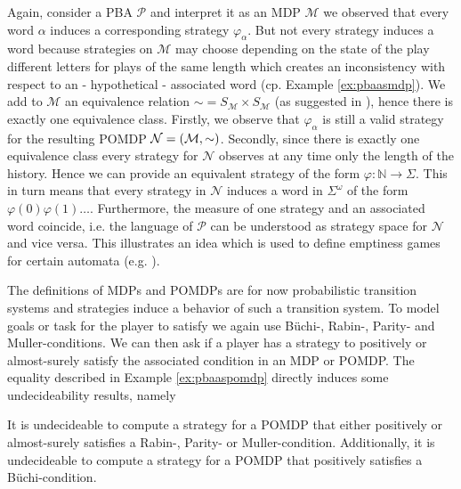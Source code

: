 \begin{example}
  Again, consider a \ac{PBA} $\mathcal{P}$ and interpret it as an \ac{MDP}
  $\mathcal{M}$ we observed that every word $\alpha$ induces a corresponding
  strategy $\varphi_{\alpha}$. But not every strategy induces a word because
  strategies on $\mathcal{M}$ may choose depending on the state of the play
  different letters for plays of the same length which creates an inconsistency
  with respect to an - hypothetical - associated word (cp. Example 
  \ref{ex:pbaasmdp}). We add to $\mathcal{M}$ an equivalence relation
  $\sim = S_{\mathcal{M}} \times S_{\mathcal{M}}$ (as suggested in
  \cite{DecProblemsForProbAuto}), hence there is exactly one equivalence class.
  Firstly, we observe that $\varphi_{\alpha}$ is still a valid strategy for the
  resulting \ac{POMDP} $\mathcal{N} = \left(\mathcal{M}, \sim\right)$. Secondly,
  since there is exactly one equivalence class every strategy for $\mathcal{N}$
  observes at any time only the length of the history. Hence we can provide an
  equivalent strategy of the form $\varphi:\mathbb{N}\rightarrow \Sigma$. This
  in turn means that every strategy in $\mathcal{N}$ induces a word in
  $\Sigma^{\omega}$ of the form $\varphi(0)\varphi(1)\dots$. Furthermore, the
  measure of one strategy and an associated word coincide, i.e. the language of
  $\mathcal{P}$ can be understood as strategy space for $\mathcal{N}$ and vice
  versa. This illustrates an idea which is used to define emptiness games for
  certain automata (e.g. \cite[Proposition 45]{RandAutoInfTrees}).
  \label{ex:pbaaspomdp}
\end{example}
The definitions of \acp{MDP} and \acp{POMDP} are for now probabilistic 
transition systems and strategies induce a behavior of such a transition 
system. To model goals or task for the player to satisfy we again use 
Büchi-, Rabin-, Parity- and Muller-conditions. We can then ask if a player has
a strategy to positively or almost-surely satisfy the associated condition in
an \ac{MDP} or \ac{POMDP}. The equality described in Example 
\ref{ex:pbaaspomdp} directly induces some undecideability results, namely
\begin{corollary}
  \cite[Corollary 3 (a)]{DecProblemsForProbAuto}
  \cite[Theorem 5]{QualAnaPOMDP}
  It is undecideable to compute a strategy for a \ac{POMDP} that either 
  positively or almost-surely satisfies a Rabin-, Parity- or Muller-condition.
  Additionally, it is undecideable to compute a strategy for a \ac{POMDP} that
  positively satisfies a Büchi-condition.
  \label{cor:posstratpomdp}
\end{corollary}
